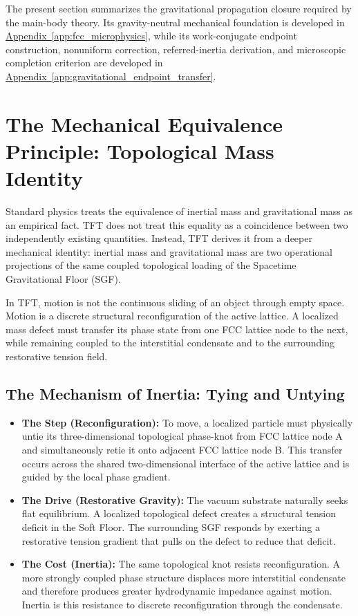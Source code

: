 The present section summarizes the gravitational propagation closure required by the main-body theory. Its gravity-neutral mechanical foundation is developed in \hyperref[app:fcc_microphysics]{Appendix~\ref*{app:fcc_microphysics}}, while its work-conjugate endpoint construction, nonuniform correction, referred-inertia derivation, and microscopic completion criterion are developed in \hyperref[app:gravitational_endpoint_transfer]{Appendix~\ref*{app:gravitational_endpoint_transfer}}.

\section{The Mechanical Equivalence Principle: Topological Mass Identity}

Standard physics treats the equivalence of inertial mass and gravitational mass as an empirical fact. TFT does not treat this equality as a coincidence between two independently existing quantities. Instead, TFT derives it from a deeper mechanical identity: inertial mass and gravitational mass are two operational projections of the same coupled topological loading of the Spacetime Gravitational Floor (SGF).

In TFT, motion is not the continuous sliding of an object through empty space. Motion is a discrete structural reconfiguration of the active lattice. A localized mass defect must transfer its phase state from one FCC lattice node to the next, while remaining coupled to the interstitial condensate and to the surrounding restorative tension field.

\subsection{The Mechanism of Inertia: Tying and Untying}

\begin{itemize}
    \item \textbf{The Step (Reconfiguration):} To move, a localized particle must physically untie its three-dimensional topological phase-knot from FCC lattice node A and simultaneously retie it onto adjacent FCC lattice node B. This transfer occurs across the shared two-dimensional interface of the active lattice and is guided by the local phase gradient.
    \item \textbf{The Drive (Restorative Gravity):} The vacuum substrate naturally seeks flat equilibrium. A localized topological defect creates a structural tension deficit in the Soft Floor. The surrounding SGF responds by exerting a restorative tension gradient that pulls on the defect to reduce that deficit.
    \item \textbf{The Cost (Inertia):} The same topological knot resists reconfiguration. A more strongly coupled phase structure displaces more interstitial condensate and therefore produces greater hydrodynamic impedance against motion. Inertia is this resistance to discrete reconfiguration through the condensate.
\end{itemize}

